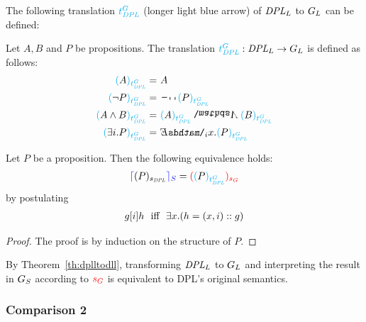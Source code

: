  The following translation $\textcolor{cyan}{t^{G}_\textit{DPL}}$ (longer light blue arrow) of  $\textit{DPL}_L$ to  $G_L$ can be defined:
\begin{definition} Let $A, B$ and $P$ be propositions. The translation $\textcolor{cyan}{t^{G}_\textit{DPL}}: \textit{DPL}_L \rightarrow G_L$ is defined as follows:
\begin{align*}
 \mdpltodl{A}  = \ & A \\
 \mdpltodl{\neg P} = \ & \n2 \mdpltodl{P} \\
 \mdpltodl{ A \land B} = \ & \mdpltodl{A} \cnj2 \mdpltodl{B} \\ 
 \mdpltodl{\exists i. P} = \ & \ex2_i x. \mdpltodl{P}
\end{align*}
\end{definition}

\begin{theorem} \label{th:dplltodll} Let $P$ be a proposition. Then the following equivalence holds:
\begin{align}
 \textcolor{blue}{\lceil}  ( P )_{s_\textit{DPL}} \textcolor{blue}{\rceil_S} = \textcolor{red}{(} \textcolor{cyan}{(} P \textcolor{cyan}{ )_{t^{G}_\textit{DPL}}} \textcolor{red}{)_{s_{G}}} \notag
\end{align}
by postulating
\begin{align}
g [i] h \ \  \text{iff} \  \ \exists x. (h = (x,i)::g) \notag
\end{align}
\end{theorem}
\begin{proof} The proof is by induction on the structure of $P$.
\end{proof}

By Theorem~\ref{th:dplltodll}, transforming $\textit{DPL}_L$ to $G_L$ and interpreting the result in $G_S$ according to $\textcolor{red}{s_{G}}$ is equivalent to DPL's original semantics. 

\subsubsection{Comparison 2}

